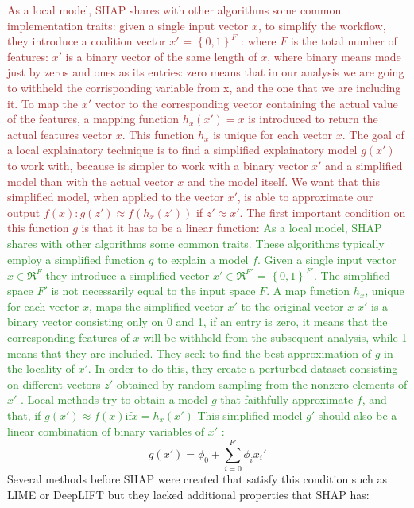 \documentclass[11pt]{report}
\begin{document}
\textcolor{brown}{
As a local model, SHAP shares with other algorithms some common implementation traits: given a single input vector $x$, to simplify the workflow, they introduce a coalition vector $x'$ = $\left\{ 0, 1 \right\}^F$ : where $F$ is the total number of features: $x'$ is a binary vector of the same length of $x$, where binary means made just by zeros and ones as its entries: zero means that in our analysis we are going to withheld the corrisponding variable from x, and the one that we are including it.
To map the $x'$ vector to the corresponding vector containing the actual value of the features, a mapping function $h_x(x') = x$ is introduced to return the actual features vector $x$. This function $h_x$ is unique for each vector $x$.
The goal of a local explainatory technique is to find a simplified explainatory model $g(x')$ to work with, because is simpler to work with a binary vector $x'$ and a simplified model than with the actual vector $x$ and the model itself.
We want that this simplified model, when applied to the vector $x'$, is able to approximate our output $f(x):  g(z') \approx f(h_x(z'))$ if $z' \approx x'$.
The first important condition on this function $g$ is that it has to be a linear function:
}
\textcolor{ForestGreen}{
As a local model, SHAP shares with other algorithms some common traits.
These algorithms typically employ a simplified function $g$ to explain a model $f$.
Given a single input vector $x \in \Re^F$ they introduce a simplified vector $x'\in \Re^{F'}$ = $\left\{ 0, 1 \right\}^{F'}$. The simplified space $F'$ is not necessarily equal to the input space $F$. A map function $h_x$, unique for each vector $x$, maps the simplified vector $x'$ to the original vector $x$
$x'$ is a binary vector consisting only on 0 and 1, if an entry is zero, it means that the corresponding features of $x$ will be withheld from the subsequent analysis, while 1 means that they are included.
They seek to find the best approximation of $g$ in the locality of $x'$. In order to do this, they create a perturbed dataset consisting on different vectors $z'$ obtained by random sampling from the nonzero elements of $x'$ \cite{ribeiro-2016}.
Local methods try to obtain a model $g$ that faithfully approximate $f$, and that, if  $g(x') \approx f(x) \text{if} x = h_x(x')$
This simplified model $g'$ should also be a linear combination of binary variables of $x'$ \cite{lundberg-2017}:
}
\begin{equation}
\label{eq:shap_g}
g(x') = \phi_0 + \sum_{i = 0}^{F'} \phi_i x_i'
\end{equation}
Several methods before SHAP were created that satisfy this condition such as LIME \cite{ribeiro-2016} or DeepLIFT \cite{shrikumar-2017} but they lacked additional properties that SHAP has:
\end{document}
